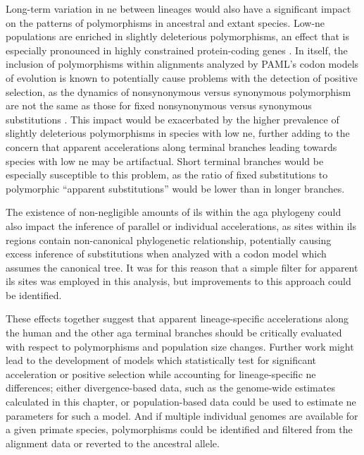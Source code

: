Long-term variation in \ac{ne} between lineages would also have a
significant impact on the patterns of polymorphisms in ancestral and
extant species. Low-\ac{ne} populations are enriched in slightly
deleterious polymorphisms, an effect that is especially pronounced in
highly constrained protein-coding genes \citep{Subramanian2011}. In
itself, the inclusion of polymorphisms within alignments analyzed by
PAML's codon models of evolution is known to potentially cause
problems with the detection of positive selection, as the dynamics of
nonsynonymous versus synonymous polymorphism are not the same as those
for fixed nonsynonymous versus synonymous substitutions
\citep{Kryazhimskiy2008}. This impact would be exacerbated by the
higher prevalence of slightly deleterious polymorphisms in species
with low \ac{ne}, further adding to the concern that apparent
accelerations along terminal branches leading towards species with low
\ac{ne} may be artifactual. Short terminal branches would be
especially susceptible to this problem, as the ratio of fixed
substitutions to polymorphic ``apparent substitutions'' would be lower
than in longer branches.

The existence of non-negligible amounts of \ac{ils} within the
\ac{aga} phylogeny could also impact the inference of parallel or
individual accelerations, as sites within \ac{ils} regions contain
non-canonical phylogenetic relationship, potentially causing excess
inference of substitutions when analyzed with a codon model which
assumes the canonical tree. It was for this reason that a simple
filter for apparent \ac{ils} sites was employed in this analysis, but
improvements to this approach could be identified.

These effects together suggest that apparent lineage-specific
accelerations along the human and the other \ac{aga} terminal branches
should be critically evaluated with respect to polymorphisms and
population size changes. Further work might lead to the development of
models which statistically test for significant \dnds acceleration or
positive selection while accounting for lineage-specific \ac{ne}
differences; either divergence-based data, such as the genome-wide
\dnds estimates calculated in this chapter, or population-based data
could be used to estimate \ac{ne} parameters for such a model. And if
multiple individual genomes are available for a given primate species,
polymorphisms could be identified and filtered from the alignment data
or reverted to the ancestral allele.

